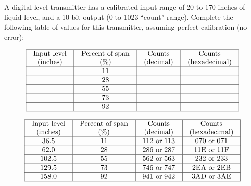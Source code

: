 

A digital level transmitter has a calibrated input range of 20 to 170 inches of liquid level, and a 10-bit output (0 to 1023 ``count'' range).  Complete the following table of values for this transmitter, assuming perfect calibration (no error):


$$\vbox{\offinterlineskip
\halign{\strut
\vrule \quad\hfil # \ \hfil & 
\vrule \quad\hfil # \ \hfil & 
\vrule \quad\hfil # \ \hfil & 
\vrule \quad\hfil # \ \hfil \vrule \cr
\noalign{\hrule}
%
Input level & Percent of span & Counts & Counts \cr
%
(inches) & (\%) & (decimal) & (hexadecimal) \cr
%
\noalign{\hrule}
%
 & 11 &  &  \cr
%
\noalign{\hrule}
%
 & 28 &  &  \cr
%
\noalign{\hrule}
%
 & 55 &  &  \cr
%
\noalign{\hrule}
%
 & 73 &  &  \cr
%
\noalign{\hrule}
%
 & 92 &  &  \cr
%
\noalign{\hrule}
} %
}$$ %








$$\vbox{\offinterlineskip
\halign{\strut
\vrule \quad\hfil # \ \hfil & 
\vrule \quad\hfil # \ \hfil & 
\vrule \quad\hfil # \ \hfil & 
\vrule \quad\hfil # \ \hfil \vrule \cr
\noalign{\hrule}
%
Input level & Percent of span & Counts & Counts \cr
%
(inches) & (\%) & (decimal) & (hexadecimal) \cr
%
\noalign{\hrule}
%
36.5 & 11 & 112 or 113 & 070 or 071  \cr
%
\noalign{\hrule}
%
62.0 & 28 & 286 or 287 & 11E or 11F \cr
%
\noalign{\hrule}
%
102.5 & 55 & 562 or 563 & 232 or 233 \cr
%
\noalign{\hrule}
%
129.5 & 73 & 746 or 747 & 2EA or 2EB \cr
%
\noalign{\hrule}
%
158.0 & 92 & 941 or 942 & 3AD or 3AE \cr
%
\noalign{\hrule}
} %
}$$ %











